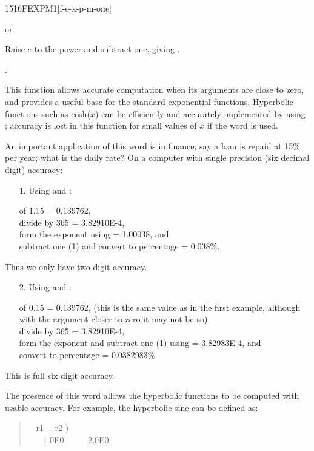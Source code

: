 \begin{worddef}{1516}{FEXPM1}[f-e-x-p-m-one]
\item {} or

	Raise $e$ to the power  and subtract one, giving .

\see {}.

	\begin{rationale} %
		This function allows accurate computation when its arguments
		are close to zero, and provides a useful base for the standard
		exponential functions. Hyperbolic functions such as
		\textsf{cosh($x$)} can be efficiently and accurately
		implemented by using ; accuracy is lost in this
		function for small values of $x$ if the word  is
		used.

		An important application of this word is in finance; say a loan
		is repaid at 15\% per year; what is the daily rate? On a computer
		with single precision (six decimal digit) accuracy:

		\begin{enumerate}
		\item[1.] Using  and :

			 of 1.15 = 0.139762, \\
			divide by 365 = 3.82910E-4, \\
			form the exponent using  = 1.00038, and \\
			subtract one (1) and convert to percentage = 0.038\%.
		\end{enumerate}
		Thus we only have two digit accuracy.
		\begin{enumerate}
		\item[2.] Using  and :

			 of 0.15 = 0.139762, (this is the same value
			as in the first example, although with the argument closer
			to zero it may not be so) \\
			divide by 365 = 3.82910E-4, \\
			form the exponent and subtract one (1) using
			 = 3.82983E-4, and \\
			convert to percentage = 0.0382983\%.
		\end{enumerate}
		This is full six digit accuracy.

		The presence of this word allows the hyperbolic functions to
		be computed with usable accuracy. For example, the hyperbolic
		sine can be defined as:

		\begin{quote}\ttfamily
			\word[core]{:} ~  r1 -{}- r2 ) \\
			\tab {}~ ~
				  1.0E0 \word{F+}~ ~ ~
				 2.0E0 
			\word[core]{;}
		\end{quote}
	\end{rationale}
\end{worddef}

